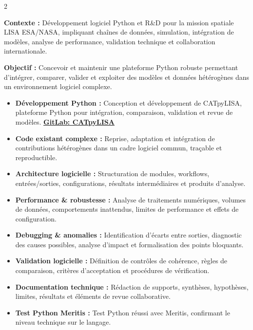 \documentclass[8pt,a4paper,ragged2e,withhyper]{altacv}
\begin{document}
\begin{paracol}{2}
\divider


\textbf{Contexte :} Développement logiciel Python et R\&D pour la mission spatiale LISA ESA/NASA, impliquant chaînes de données, simulation, intégration de modèles, analyse de performance, validation technique et collaboration internationale.

\textbf{Objectif :} Concevoir et maintenir une plateforme Python robuste permettant d’intégrer, comparer, valider et exploiter des modèles et données hétérogènes dans un environnement logiciel complexe.

\begin{itemize}
  \item \textbf{Développement Python :} Conception et développement de CATpyLISA, plateforme Python pour intégration, comparaison, validation et revue de modèles.
  \textcolor{DarkPastelRed}{\href{https://gitlab.oca.eu/gboileau/lisa_l3_tools}{\bf GitLab: CATpyLISA}}
  \item \textbf{Code existant complexe :} Reprise, adaptation et intégration de contributions hétérogènes dans un cadre logiciel commun, traçable et reproductible.
  \item \textbf{Architecture logicielle :} Structuration de modules, workflows, entrées/sorties, configurations, résultats intermédiaires et produits d’analyse.
  \item \textbf{Performance \& robustesse :} Analyse de traitements numériques, volumes de données, comportements inattendus, limites de performance et effets de configuration.
  \item \textbf{Debugging \& anomalies :} Identification d’écarts entre sorties, diagnostic des causes possibles, analyse d’impact et formalisation des points bloquants.
  \item \textbf{Validation logicielle :} Définition de contrôles de cohérence, règles de comparaison, critères d’acceptation et procédures de vérification.
  \item \textbf{Documentation technique :} Rédaction de supports, synthèses, hypothèses, limites, résultats et éléments de revue collaborative.
  \item \textbf{Test Python Meritis :} Test Python réussi avec Meritis, confirmant le niveau technique sur le langage.
\end{itemize}

\divider


\end{paracol}
\end{document}
